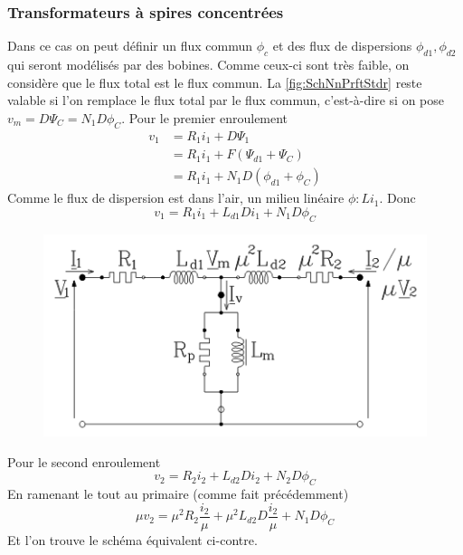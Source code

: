 		\subsubsection{Transformateurs à spires concentrées}
		Dans ce cas on peut définir un flux commun $\phi_c$ et des flux de 
		dispersions $\phi_{d1},\phi_{d2}$ qui seront modélisés par des bobines. 
		Comme ceux-ci sont très faible, on 
		considère que le flux total est le flux commun. La \autoref{fig:SchNnPrftStdr}
		reste valable si l'on remplace le flux total par le flux commun, c'est-à-dire 
		si on pose $v_m = D\Psi_C=N_1D\phi_C$.
		Pour le premier enroulement
		\begin{equation}
		\begin{array}{ll}
		v_1 &= R_1i_1 + D\Psi_1\\
		&= R_1i_1 + F(\Psi_{d1}+\Psi_C)\\
		&= R_1i_1 + N_1D(\phi_{d1}+\phi_C)
		\end{array}
		\end{equation}
		Comme le flux de dispersion est dans l'air, un milieu linéaire $\phi : Li_1$. 
		Donc
		\begin{equation}
		v_1 = R_1i_1 + L_{d1}Di_1+N_1D\phi_C
		\end{equation}
		\begin{figure}
		\includegraphics[scale=0.5]{ch3/imager3.png}
		\end{figure}				
		Pour le second enroulement	
		\begin{equation}
		v_2 = R_2i_2 + L_{d2}Di_2+N_2D\phi_C
		\end{equation}	
		En ramenant le tout au primaire (comme fait précédemment)
		\begin{equation}
		\mu v_2 = \mu^2R_2\dfrac{i_2}{\mu}+\mu^2L_{d2}D\dfrac{i_2}{\mu}+N_1D\phi_C
		\end{equation}
		Et l'on trouve le schéma équivalent ci-contre.\\
		
